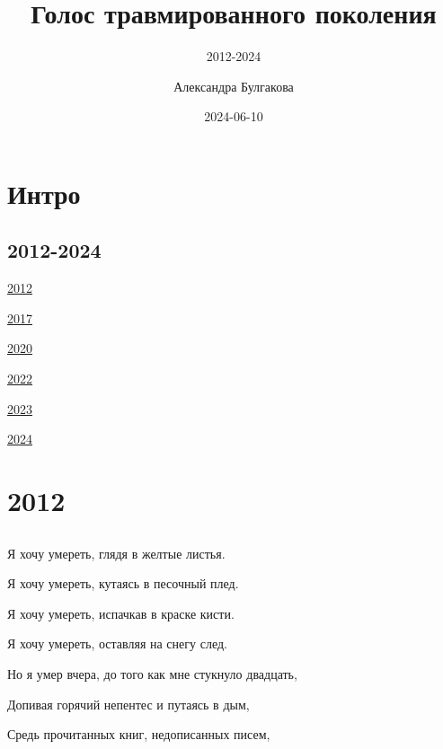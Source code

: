 \documentclass[
  a5paperpaper,
  DIV=11,
  numbers=noendperiod]{scrreprt}
\title{Голос травмированного поколения}
\subtitle{2012-2024}
\author{Александра Булгакова}
\date{2024-06-10}
\renewcommand*\contentsname{Содержание}
\newcommand\contentsname{Содержание}
\begin{document}
\maketitle

\renewcommand*\contentsname{Содержание}
{
\hypersetup{linkcolor=}
\setcounter{tocdepth}{2}
\tableofcontents
}


\chapter*{Интро}\label{ux438ux43dux442ux440ux43e}


\section*{2012-2024}\label{section}


\href{./2012.qmd}{2012}

\href{./2017.qmd}{2017}

\href{./2020.qmd}{2020}

\href{./2022.qmd}{2022}

\href{./2023.qmd}{2023}

\href{./2024.qmd}{2024}


\chapter{2012}\label{section-1}

\section{}\label{section-2}

Я хочу умереть, глядя в желтые листья.

Я хочу умереть, кутаясь в песочный плед.

Я хочу умереть, испачкав в краске кисти.

Я хочу умереть, оставляя на снегу след.

Но я умер вчера, до того как мне стукнуло двадцать,

Допивая горячий непентес и путаясь в дым,

Средь прочитанных книг, недописанных писем,
\end{document}

